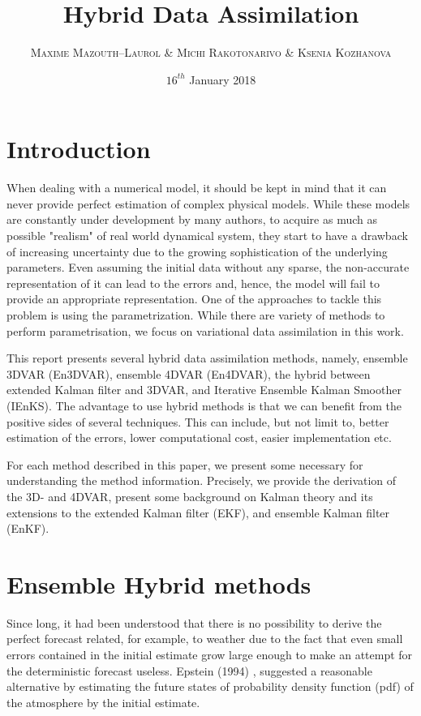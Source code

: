 \documentclass[a4,12pt]{article}
\title{\textbf{Hybrid Data Assimilation}}
\author{
\begin{tabular}{cc}
	\textsc{Maxime Mazouth--Laurol} \& \textsc{Michi Rakotonarivo} \& \textsc{Ksenia Kozhanova}
\end{tabular}}
\date{\small $16^{th}$ January 2018}
\numberwithin{equation}{section}
\begin{document}
\maketitle


\section{Introduction}
When dealing with a numerical model, it should be kept in mind that it can never provide perfect estimation of complex physical models. While these models are constantly under development by many authors, to acquire as much as possible "realism" of real world dynamical system, they start to have a drawback of increasing uncertainty due to the growing sophistication of the underlying parameters. Even assuming the initial data without any sparse, the non-accurate representation of it can lead to the errors and, hence, the model will fail to provide an appropriate representation. One of the approaches to tackle this problem is using the parametrization. While there are variety of methods to perform parametrisation, we focus on variational data assimilation in this work.

This report presents several hybrid data assimilation methods, namely, ensemble 3DVAR (En3DVAR), ensemble 4DVAR (En4DVAR), the hybrid between extended Kalman filter and 3DVAR, and  Iterative Ensemble Kalman Smoother (IEnKS). The advantage to use hybrid methods is that we can benefit from the positive sides of several techniques. This can include, but not limit to, better estimation of the errors, lower computational cost, easier implementation etc. 

For each method described in this paper, we present some necessary for understanding the method information. Precisely, we provide the derivation of the 3D- and 4DVAR, present some background on Kalman theory and its extensions to the extended Kalman filter (EKF), and ensemble Kalman filter (EnKF).

\section{Ensemble Hybrid methods}

Since long, it had been understood that there is no possibility to derive the perfect forecast related, for example, to weather due to the fact that even small errors contained in the initial estimate grow large enough to make an attempt for the deterministic forecast useless. Epstein (1994) \cite{evensen}, suggested a reasonable alternative by estimating the future states of probability density function (pdf)  of the atmosphere by the initial estimate.
\end{document}
